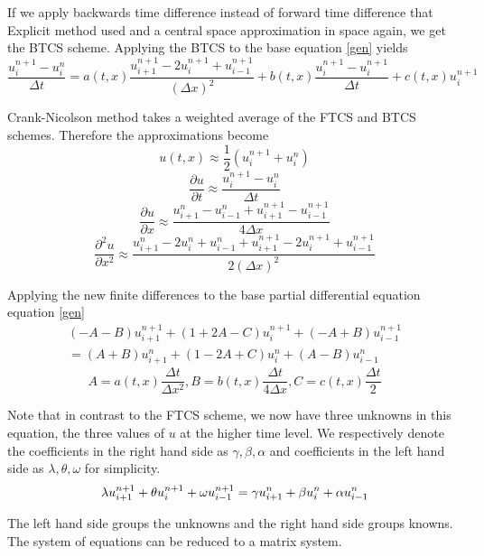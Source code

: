 \documentclass[12pt, oneside]{book}
\theoremstyle{plain}
\theoremstyle{definition}
\begin{document}
 If we apply backwards time difference instead of forward time difference that Explicit method used and a central space approximation in space again, we get the BTCS scheme. Applying the BTCS to the base equation \ref{gen} yields
    \begin{equation}
\frac{u^{n+1}_i - u^n_i}{\Delta t}  = a(t, x)  \frac{u^{n+1}_{i+1}- 2u^{n+1}_i + u^{n+1}_{i-1}}{(\Delta x)^2}  + b(t, x)  \frac{u^{n+1}_i - u^{n+1}_i}{\Delta t}  + c(t, x)  u^{n+1}_i
\end{equation}

Crank-Nicolson method takes a weighted average of the FTCS and BTCS schemes. Therefore the approximations become
$$ u(t,x) \approx \frac{1}{2} ( u^{n+1}_i +  u^n_i) $$
$$ \frac{\partial u}{\partial t} \approx \frac{u^{n+1}_i - u^n_i}{\Delta t} $$
$$ \frac{\partial u}{\partial x} \approx \frac{u^n_{i+1} - u^n_{i-1} + u^{n+1}_{i+1} - u^{n+1}_{i-1}}{4\Delta x} $$
$$ \frac{\partial^2 u}{\partial x^2} \approx \frac{u^n_{i+1}- 2u^n_i + u^n_{i-1} + u^{n+1}_{i+1}- 2u^{n+1}_i + u^{n+1}_{i-1}}{2(\Delta x)^2} $$

Applying the new finite differences to the base partial differential equation equation \ref{gen}
\begin{multline}
 (-A -B) u^{n+1}_{i+1} + (1 + 2A - C) u^{n+1}_i + (-A + B) u^{n+1}_{i-1} \\
=  (A+B) u^{n}_{i+1} + (1 - 2A + C) u^{n}_i + (A - B) u^{n}_{i-1}
\end{multline}
$$ A = a(t,x) \frac{\Delta t}{\Delta x^2},  B = b(t,x) \frac{\Delta t}{4\Delta x}, C = c(t,x) \frac{\Delta t}{2}$$ 

Note that in contrast to the FTCS scheme, we now have three unknowns in this equation, the three values of $u$ at the higher time level.  We respectively denote the coefficients in the right hand side as $\gamma, \beta, \alpha$ and coefficients in the left hand side as $\lambda, \theta, \omega$ for simplicity.
\begin{equation}
\lambda u^{n+1}_{i+1} + \theta u^{n+1}_i + \omega u^{n+1}_{i-1} \\
=  \gamma u^{n}_{i+1} + \beta u^{n}_i + \alpha u^{n}_{i-1}
\end{equation}

The left hand side groups the unknowns and the right hand side groups knowns. The system of equations can be  reduced to a matrix system.
\end{document}

